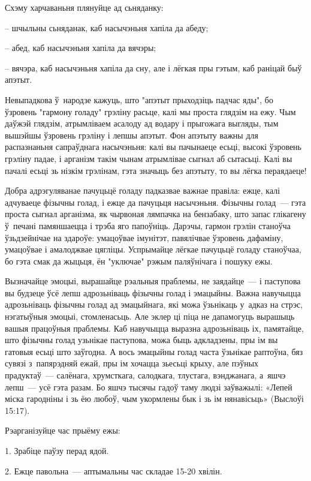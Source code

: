 Схэму харчаваньня плянуйце ад сьняданку: 

– шчыльны сьняданак, каб насычэньня хапіла да абеду;

– абед, каб насычэньня хапіла да вячэры;

– вячэра, каб насычэньня хапіла да сну, але і лёгкая пры гэтым, каб раніцай быў апэтыт.

Невыпадкова ў~народзе кажуць, што "апэтыт прыходзіць падчас яды", бо ўзровень "гармону голаду" грэліну расьце, калі мы проста глядзім на ежу. Чым даўжэй глядзім, атрымліваем асалоду ад водару і прыгожага выгляды, тым вышэйшы ўзровень грэліну і лепшы апэтыт. Фон апэтыту важны для распазнаньня сапраўднага насычэньня: калі вы пачынаеце есьці, высокі ўзровень грэліну падае, і арганізм такім чынам атрымлівае сыгнал аб сытасьці. Калі вы пачалі есьці зь нізкім грэлінам, гэта значыць без апэтыту, то вы лёгка пераядаеце!

Добра адрэгуляванае пачуцьцё голаду падказвае важнае правіла: ежце, калі адчуваеце фізычны голад, і ежце да пачуцьця насычэньня. Фізычны голад~--- гэта проста сыгнал арганізма, як чырвоная лямпачка на бензабаку, што запас глікагену ў~печані памяншаецца і трэба яго папоўніць. Дарэчы, гармон грэлін станоўча ўзьдзейнічае на здароўе: умацоўвае імунітэт, павялічвае ўзровень дафаміну, умацоўвае і амалоджвае цягліцы. Успрымайце лёгкае пачуцьцё голаду станоўчаа, бо гэта смак да жыцьця, ён "уключае" рэжым паляўнічага і пошуку ежы.

Вызначайце эмоцыі, вырашайце рэальныя праблемы, не заядайце~--- і паступова вы будзеце ўсё лепш адрозьніваць фізычны голад і эмацыйны. Важна навучыцца адрозьніваць фізычны голад ад эмацыйнага, які можа ўзьнікаць у~адказ на стрэс, нэгатыўныя эмоцыі, стомленасьць. Але эклер ці піца не дапамогуць вырашыць вашыя працоўныя праблемы. Каб навучыцца выразна адрозьніваць іх, памятайце, што фізычны голад узьнікае паступова, можа быць адкладзены, пры ім вы гатовыя есьці што заўгодна. А вось эмацыйны голад часта ўзьнікае раптоўна, бяз сувязі з~папярэдняй ежай, пры ім хочацца зьесьці крыху, але пэўных прадуктаў~--- салёнага, хрумсткага, салодкага, тлустага, вэнджанага, а~яшчэ лепш~--- усё гэта разам. Бо яшчэ тысячы гадоў таму людзі заўважылі: «Лепей міска гародніны і зь ёю любоў, чым укормлены бык і зь ім нянавісьць» (Выслоўі 15:17).

Рэарганізуйце час прыёму ежы:

1. Зрабіце паўзу перад ядой.

2. Ежце павольна~--- аптымальны час складае 15-20 хвілін.

